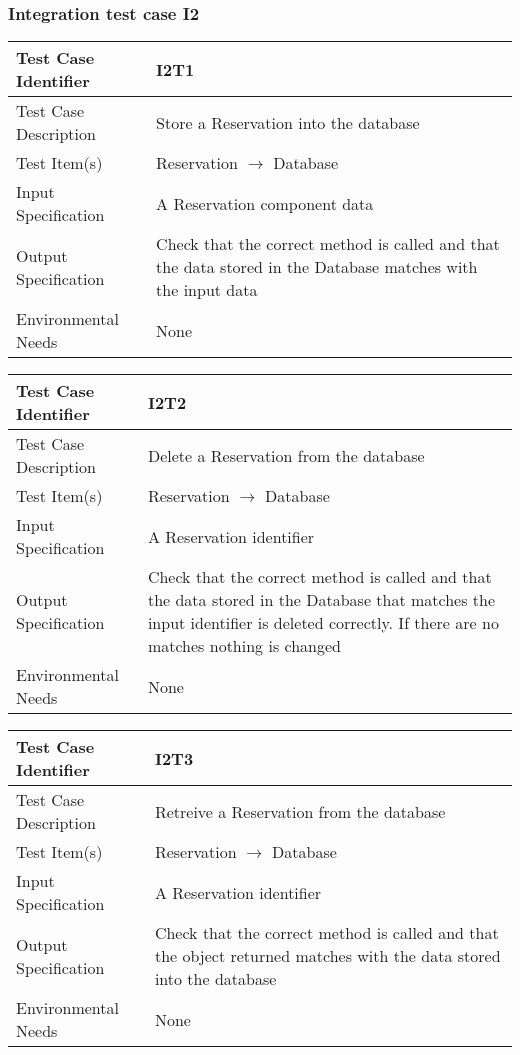 		\subsubsection{Integration test case I2}
		\begin{center}
			\begin{tabular}{ |l p{10cm}| } \hline
				Test Case Identifier & I2T1 \\ \hline
				Test Case Description & Store a Reservation into the database \\ \hline
				Test Item(s) & Reservation $\rightarrow$ Database \\ \hline
				Input Specification & A Reservation component data \\ \hline
				Output Specification & Check that the correct method is called and that the data stored in the Database
				matches with the input data \\ \hline
				Environmental Needs & None \\ \hline
			\end{tabular}
			\begin{tabular}{ |l p{10cm}| } \hline
				Test Case Identifier & I2T2 \\ \hline
				Test Case Description & Delete a Reservation from the database \\ \hline
				Test Item(s) & Reservation $\rightarrow$ Database \\ \hline
				Input Specification & A Reservation identifier \\ \hline
				Output Specification & Check that the correct method is called and that the data stored in the Database
				that matches the input identifier is deleted correctly. If there are no matches nothing is changed \\ \hline
				Environmental Needs & None \\ \hline
			\end{tabular}
			\begin{tabular}{ |l p{10cm}| } \hline
		        Test Case Identifier & I2T3 \\ \hline
		        Test Case Description & Retreive a Reservation from the database \\ \hline
		      	Test Item(s) & Reservation $\rightarrow$ Database \\ \hline
		        Input Specification & A Reservation identifier \\ \hline
		        Output Specification & Check that the correct method is called and that the object returned
		        matches with the data stored into the database\\ \hline
		        Environmental Needs & None \\ \hline
		    \end{tabular}
		\end{center}
